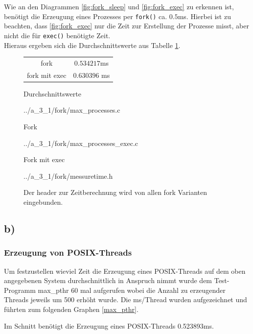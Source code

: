 \documentclass[a4paper,
12pt,
BCOR12mm,
]{scrartcl}
\begin{document}
Wie an den Diagrammen \ref{fig:fork_sleep} und \ref{fig:fork_exec} zu erkennen ist,
benötigt die Erzeugung eines Prozesses per \verb|fork()| ca. $0.5$ms.
Hierbei ist zu beachten, dass \ref{fig:fork_exec} nur die Zeit zur Erstellung der Prozesse
misst, aber nicht die für \verb|exec()| benötigte Zeit. \\
Hieraus ergeben sich die Durchschnittswerte aus Tabelle \ref{fig:fork_mean}.
 \begin{figure}[h!] 
	\begin{center}
		\begin{tabular}[h!]{c|c}
			\hline
			fork & $0.534217$ms	 \\
			fork mit exec & $0.630396$ ms\\
			\hline
		\end{tabular}
	\end{center}
	\caption{Durchschnittswerte}
	\label{fig:fork_mean}
\end{figure}


\begin{figure}[h!]
	\begin{center}
		 {../a_3_1/fork/max_processes.c}
	\end{center}
	\caption{Fork}
	\label{fig:fork_listing}
\end{figure} 

\begin{figure}[h!]
	\begin{center}
		 {../a_3_1/fork/max_processes_exec.c}
	\end{center}
	\caption{Fork mit exec}
	\label{fig:fork_exec_listing}
\end{figure}

\begin{figure}[h!]
	\begin{center}
		 {../a_3_1/fork/messuretime.h}
	\end{center}
	\caption{Der header zur Zeitberechnung wird von allen fork Varianten eingebunden.}
	\label{fig:messuretime}
\end{figure}
\subsection{b)}
\subsubsection{Erzeugung von POSIX-Threads}
Um festzustellen wieviel Zeit die Erzeugung eines POSIX-Threads auf dem oben angegebenen System durchschnittlich
in Anspruch nimmt wurde dem Test-Programm max\_pthr 60 mal aufgerufen wobei die Anzahl zu erzeugender Threads
jeweils um 500 erhöht wurde. Die ms/Thread wurden aufgezeichnet und führten zum folgenden Graphen \ref{max_pthr}.
\begin{figure}[h!]
	\begin{center}
	\end{center}
\end{figure}
Im Schnitt benötigt die Erzeugung eines POSIX-Threads 0.523893ms.
\end{document}
